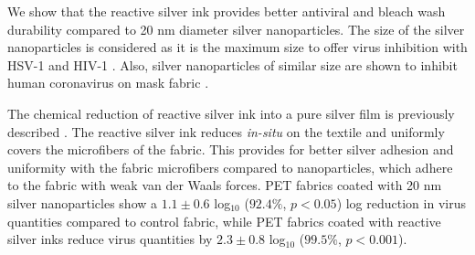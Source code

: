 \documentclass[10pt,letterpaper]{article}
\begin{document}
We show that the reactive silver ink provides better antiviral and bleach wash durability compared to 20 nm diameter silver nanoparticles. The size of the silver nanoparticles is considered as it is the maximum size to offer virus inhibition with HSV-1 and HIV-1  \cite{akbarzadeh:2018,elechiguerra_interaction_2005}. Also, silver nanoparticles of similar size are shown to inhibit human coronavirus on mask fabric \cite{abulikemu:2022}. 

The chemical reduction of reactive silver ink into a pure silver film is previously described \cite{Walker:12}. The reactive silver ink reduces \textit{in-situ}
on the textile and uniformly covers 
the microfibers of the fabric.
This provides for better silver adhesion and uniformity with the fabric microfibers compared to nanoparticles, which adhere to the fabric with weak van der Waals forces. 
PET fabrics coated with 20 nm silver nanoparticles %
show a $1.1 \pm 0.6$ log$_{10}$ ($92.4 %
\%$, $p < 0.05$) log reduction in virus quantities compared to control fabric, 
while PET fabrics coated with reactive silver inks reduce virus quantities by $2.3 \pm 0.8$ log$_{10}$ ($99.5 %
\%$, $p < 0.001$). 
\end{document}
